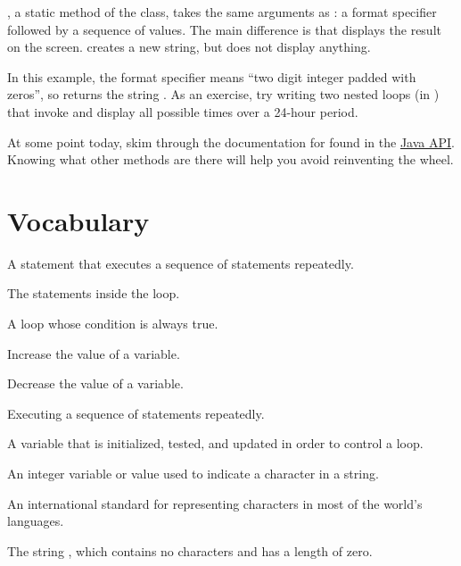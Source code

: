 
, a static method of the  class, takes the same arguments as : a format specifier followed by a sequence of values.
The main difference is that  displays the result on the screen.
 creates a new string, but does not display anything.

In this example, the format specifier  means ``two digit integer padded with zeros'', so  returns the string .
As an exercise, try writing two nested  loops (in ) that invoke  and display all possible times over a 24-hour period.

At some point today, skim through the documentation for  found in the \href{https://docs.oracle.com/javase/8/docs/api/}{Java API}.
Knowing what other methods are there will help you avoid reinventing the wheel.


\section{Vocabulary}

\begin{description}

A statement that executes a sequence of statements repeatedly.

The statements inside the loop.

A loop whose condition is always true.

Increase the value of a variable.

Decrease the value of a variable.

Executing a sequence of statements repeatedly.

A variable that is initialized, tested, and updated in order to control a loop.

An integer variable or value used to indicate a character in a string.

An international standard for representing characters in most of the world's languages.

The string , which contains no characters and has a length of zero.

\end{description}


